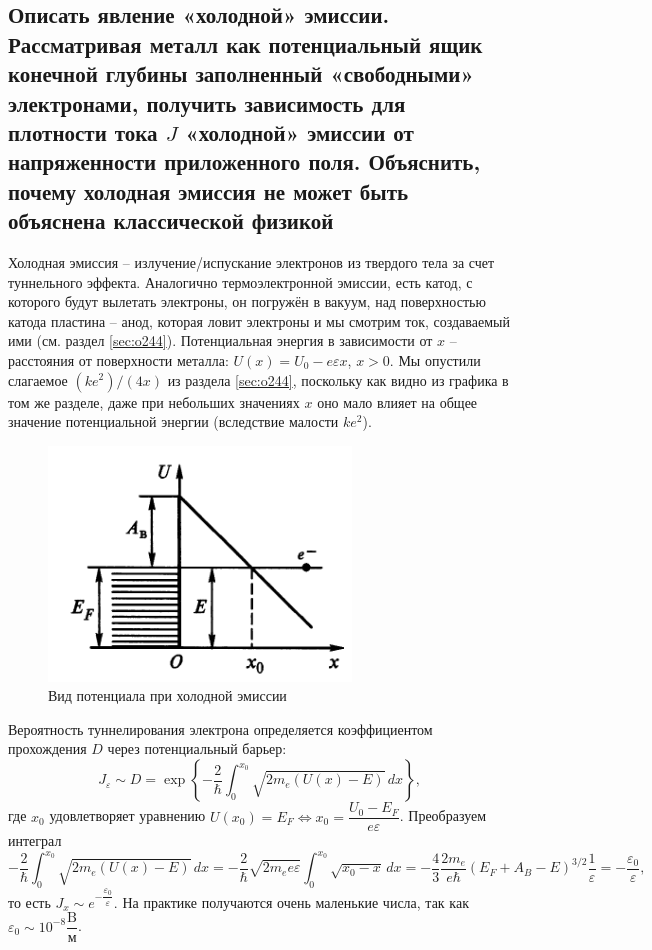 \subsection{Описать явление «холодной» эмиссии. Рассматривая металл как потенциальный ящик
конечной глубины заполненный «свободными» электронами, получить зависимость для плотности
тока $J$ «холодной» эмиссии от напряженности приложенного поля. Объяснить, почему холодная
эмиссия не может быть объяснена классической физикой}
Холодная эмиссия -- излучение/испускание электронов из твердого тела за счет туннельного
эффекта. Аналогично термоэлектронной эмиссии, есть катод, с которого будут вылетать электроны,
он погружён в вакуум, над поверхностью катода пластина -- анод, которая ловит электроны и мы 
смотрим ток, создаваемый ими (см. раздел \ref{sec:o244}).
Потенциальная энергия в зависимости от $x$ -- расстояния от поверхности
металла: 
$U(x) = U_0 - e \varepsilon x$, $x>0$.
Мы опустили слагаемое $ (ke^2)/(4x) $ из раздела \ref{sec:o244}, поскольку как
видно из графика в том же разделе, даже при небольших значениях $ x $ оно мало
влияет на общее значение потенциальной энергии (вследствие малости $ ke^2 $).
\begin{figure}[H]
  \centering
  \includegraphics[width=.4\linewidth]{img/write-08/barier.png}
  \caption{Вид потенциала при холодной эмиссии}
  \label{fig:cold-emission}
\end{figure}

Вероятность туннелирования электрона определяется
коэффициентом прохождения $D$ через потенциальный барьер:
\[
  J_{\varepsilon} \sim D = \exp \left\{ - \dfrac{2}{\hbar} \int_0^{x_0} \sqrt{2m_e (U(x) - E)} \, dx \right\},
\]
где $x_0$ удовлетворяет уравнению
$U(x_0) = E_F \Leftrightarrow x_0 = \dfrac{U_0 - E_F}{e \varepsilon}$.
Преобразуем интеграл
\[
  - \dfrac{2}{\hbar} \int_0^{x_0} \sqrt{2m_e (U(x) - E)} \, dx 
  = - \dfrac{2}{\hbar} \sqrt{2m_e e \varepsilon} \int_0^{x_0} \sqrt{ x_0 - x } \, dx
  = - \dfrac{4}{3} \dfrac{2m_e}{e\hbar} (E_F + A_B - E)^{3/2} \dfrac{1}{\varepsilon}
  = - \dfrac{\varepsilon_0}{\varepsilon},
\]
то есть $J_x \sim e^{- \dfrac{\varepsilon_0}{\varepsilon}}$. На практике получаются очень
маленькие числа, так как $\varepsilon_0 \sim 10^{-8} \dfrac{\text{B}}{\text{м}}$.
